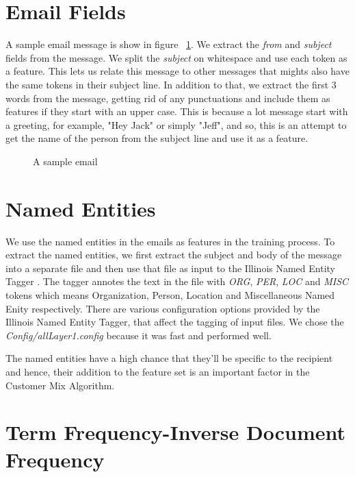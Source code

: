 \documentclass[senior,oneside]{UIUC}
\begin{document}
\section{Email Fields}
\label{sec:email-fields}

A sample email message is show in figure ~\ref{fig:sample-email}.
We extract the \emph{from} and \emph{subject} fields from the message. We split the \emph{subject} on whitespace and use each token as a feature. This lets us relate this message to other messages that mights also have the same tokens in their subject line. In addition to that, we extract the first 3 words from the message, getting rid of any punctuations and include them as features if they start with an upper case. This is because a lot message start with a greeting, for example, "Hey Jack" or simply "Jeff", and so, this is an attempt to get the name of the person from the subject line and use it as a feature.

\begin{figure}
    \caption{A sample email}
    \label{fig:sample-email}
\end{figure}

\section{Named Entities}
\label{sec:named-entities}

We use the named entities in the emails as features in the training process. To extract the named entities, we first extract the subject and body of the message into a separate file and then use that file as input to the Illinois Named Entity Tagger \cite{ner}. The tagger annotes the text in the file with \emph{ORG}, \emph{PER}, \emph{LOC} and \emph{MISC} tokens which means Organization, Person, Location and Miscellaneous Named Enity respectively. There are various configuration options provided by the Illinois Named Entity Tagger, that affect the tagging of input files. We chose the \emph{Config/allLayer1.config} because it was fast and performed well.

The named entities have a high chance that they'll be specific to the recipient and hence, their addition to the feature set is an important factor in the Customer Mix Algorithm.

\section{Term Frequency-Inverse Document Frequency}
\label{sec:tf-idf}
\end{document}
